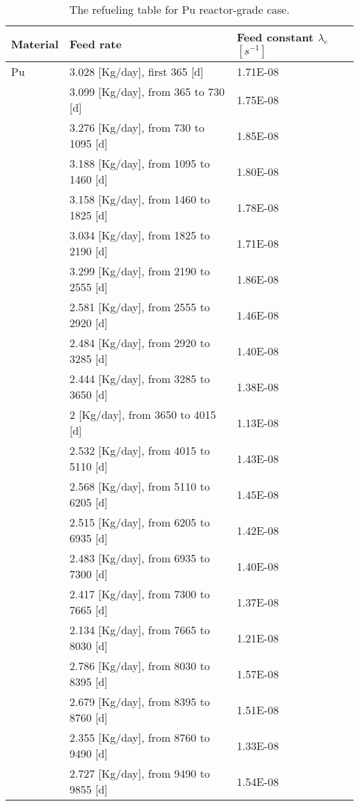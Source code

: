 \newpage
\begin{longtable}{|p{}|p{}|p{}|}
	\caption{The refueling table for Pu reactor-grade case.} 
	\vspace{-0.2in}
	\label{tab:table9}
	\endfirsthead
	\endhead
		\hline
		\textbf{Material} & \textbf{Feed rate} & \textbf{Feed 
		constant} $\lambda_{e}$ $[s^{-1}]$ \\
		\hline
		Pu        &  3.028 [Kg/day], first 365 [d] & 1.71E-08 \\
		&  3.099 [Kg/day], from 365 to 730 [d] & 		1.75E-08 \\
		&  3.276 [Kg/day], from 730 to 1095 [d] & 		1.85E-08 \\
		&  3.188 [Kg/day], from 1095 to 1460 [d]& 		1.80E-08	\\
		&  3.158 [Kg/day], from 1460 to 1825 [d] &		1.78E-08	\\
		& 3.034 [Kg/day], from 1825 to 2190 [d] &		1.71E-08	\\
		& 3.299   [Kg/day], from 2190 to 2555 [d] &	1.86E-08	\\
		&  2.581  [Kg/day], from 2555 to 2920 [d]&		1.46E-08		\\
		&  2.484  [Kg/day], from 2920 to 3285 [d]&		1.40E-08	 \\ 
		&  2.444  [Kg/day], from 3285 to 3650 [d]&		1.38E-08	 \\ 
		&   2 [Kg/day], from 3650 to 4015 [d]&		1.13E-08	 \\ 
		&  2.532  [Kg/day], from 4015 to 5110 [d]&		1.43E-08	 \\
		&  2.568  [Kg/day], from 5110 to 6205 [d]&		1.45E-08	 \\
		&  2.515  [Kg/day], from 6205 to 6935 [d]&		1.42E-08	 \\
		& 2.483 [Kg/day], from 6935 to 7300 [d]&		1.40E-08	 \\
		&  2.417  [Kg/day], from 7300 to 7665 [d]&		1.37E-08	 \\
		&  2.134  [Kg/day], from 7665 to 8030 [d]&		1.21E-08	 \\
		&  2.786  [Kg/day], from 8030 to 8395 [d]&		1.57E-08	 \\
		&   2.679 [Kg/day], from 8395 to 8760 [d]&		1.51E-08	 \\
		&  2.355   [Kg/day], from 8760 to 9490 [d]&		1.33E-08	 \\
		&  2.727  [Kg/day], from 9490 to 9855 [d]&		1.54E-08	 \\

\end{longtable}
